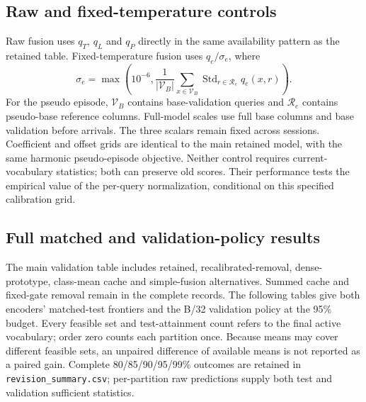 \documentclass[preprint,review,12pt]{elsarticle}
\begin{document}
\subsection{Raw and fixed-temperature controls}
Raw fusion uses $q_T$, $q_L$ and $q_P$ directly in the same availability pattern
as the retained table. Fixed-temperature fusion uses $q_e/\sigma_e$, where
\[
 \sigma_e=\max\!\left(10^{-6},\frac{1}{|\mathcal V_B|}
 \sum_{x\in\mathcal V_B}\operatorname{Std}_{r\in\mathcal R_e}q_e(x,r)\right).
\]
For the pseudo episode, $\mathcal V_B$ contains base-validation queries and
$\mathcal R_e$ contains pseudo-base reference columns. Full-model scales use
full base columns and base validation before arrivals. The three scalars remain
fixed across sessions. Coefficient and offset grids are identical to the main
retained model, with the same harmonic pseudo-episode objective. Neither control
requires current-vocabulary statistics; both can preserve old scores. Their
performance tests the empirical value of the per-query normalization, conditional
on this specified calibration grid.

\subsection{Full matched and validation-policy results}
The main validation table includes retained, recalibrated-removal, dense-prototype,
class-mean cache and simple-fusion alternatives. Summed cache and fixed-gate
removal remain in the complete records. The following tables give both encoders'
matched-test frontiers and the B/32 validation policy at the 95\% budget. Every
feasible set and test-attainment count refers to the final active vocabulary;
order zero counts each partition once. Because means may cover different
feasible sets, an unpaired difference of available means is not reported as a
paired gain. Complete 80/85/90/95/99\% outcomes are retained in
\texttt{revision\_summary.csv}; per-partition raw predictions supply both test
and validation sufficient statistics.
\end{document}
